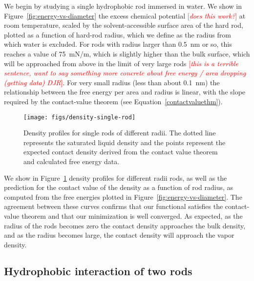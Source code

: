 \documentclass[letterpaper,twocolumn,amsmath,amssymb,prb]{revtex4-1}
\newcommand{\fixme}[1]{\textcolor{red}{[\emph{#1}]}}
\begin{document}
We begin by studying a single hydrophobic rod immersed in water.
We show in Figure~\ref{fig:energy-vs-diameter} the excess chemical
potential \fixme{does this work?} at room temperature, scaled by the solvent-accessible
surface area of the hard rod, plotted as a function of hard-rod
radius, which we define as the radius from which water is excluded.
For rods with radius larger than 0.5~nm or so, this reaches a value of
75~mN/m, which is slightly higher than the bulk surface, which will be
approached from above in the limit of very large rods \fixme{this is a
terrible sentence, want to say something more concrete about free
energy / area dropping (getting data) DJR}.  For very small
radius (less than about 0.1~nm) the relationship between the free
energy per area and radius is linear, with the slope required by the
contact-value theorem (see Equation~\ref{contactvaluethm}).

\begin{figure}
\begin{center}
\texttt{[image: figs/density-single-rod]}
\end{center}
\caption{ Density profiles for single rods of different radii. The dotted line
represents the saturated liquid density and the points represent the
expected contact density derived from the contact value theorem and
calculated free energy data.}
\label{fig:density-single-rod}
\end{figure}

We show in Figure~\ref{fig:density-single-rod} density profiles for
different radii rods, as well as the prediction for the contact value
of the density as a function of rod radius, as computed from the free
energies plotted in Figure~\ref{fig:energy-vs-diameter}.  The
agreement between these curves confirms that our functional satisfies
the contact-value theorem and that our minimization is well converged.
As expected, as the radius of the rods becomes zero the
contact density approaches the bulk density, and as the radius becomes
large, the contact density will approach the vapor density.

\subsection{Hydrophobic interaction of two rods}
\end{document}
